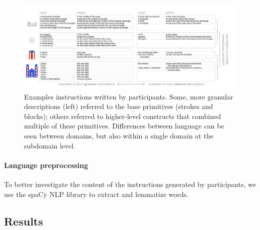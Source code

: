 \documentclass[10pt,letterpaper]{article}
\begin{document}
\begin{figure}
  \begin{center}
  \includegraphics[width=0.99\linewidth]{figures/instruction_examples.pdf}
  \caption{Examples instructions written by participants. Some, more granular descriptions (left) referred to the base primitives (strokes and blocks); others referred to higher-level constructs that combined multiple of these primitives. Differences between language can be seen between domains, but also within a single domain at the subdomain level.}
  \label{fig:intruction_examples}
  \end{center}
  \end{figure}

\paragraph{Language preprocessing} %
To better investigate the content of the instructions generated by participants, we use the spaCy NLP library to extract and lemmatize words. %





\subsection{Results}
\end{document}
